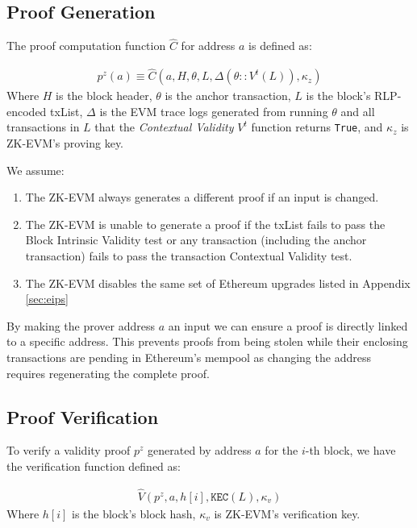 \documentclass[9pt,oneside]{amsart}
\begin{document}
\begin{multicols}{2}
\subsection{Proof Generation} The proof computation function $\hat{C}$ for address $a$ is defined as:

\begin{eqnarray}
    p^z(a) \equiv \hat{C}(a, H,\theta, L, \Delta(\theta::V^t(L)),\kappa_z )
\end{eqnarray}
Where $H$ is the block header, $\theta$ is the anchor transaction, $L$ is the block's RLP-encoded txList, $\Delta$ is the EVM trace logs generated from running $\theta$ and all transactions in $L$ that the \textit{Contextual Validity} $V^t$ function returns \texttt{True}, and $\kappa_z$ is  ZK-EVM's proving key.

We assume:
\begin{enumerate}
\item The ZK-EVM always generates a different proof if an input is changed.
\item The ZK-EVM is unable to generate a proof if the txList fails to pass the Block Intrinsic Validity test or any transaction (including the anchor transaction) fails to pass the transaction Contextual Validity test.
\item The ZK-EVM disables the same set of Ethereum upgrades listed in Appendix \ref{sec:eips}
\end{enumerate}

By making the prover address $a$ an input we can ensure a proof is directly linked to a specific address. This prevents proofs from being stolen while their enclosing transactions are pending in Ethereum's mempool as changing the address requires regenerating the complete proof.

\subsection{Proof Verification} To verify a validity proof $p^z$ generated by address $a$ for the $i$-th block, we have the verification function defined as:

\begin{eqnarray}
    \hat{V}(p^z, a, h[i], \texttt{KEC}(L), \kappa_v)
\end{eqnarray}
Where $h[i]$ is the block's block hash, $\kappa_v$ is ZK-EVM's verification key.


\end{multicols}
\end{document}
